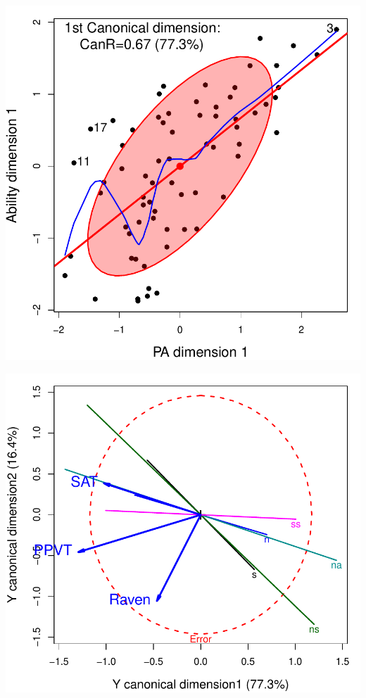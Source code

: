 \begin{frame}
  \hfill
  \begin{minipage}[c]{.35\textwidth}
   \includegraphics[width=1\linewidth,clip]{figures/rohwer-cancor}
   \end{minipage}%
  \hfill
  \begin{minipage}[c]{.35\textwidth}
   \includegraphics[width=1\linewidth,clip]{figures/rohwer-cancor-HE}
  \end{minipage}
  \hfill
\end{frame}

